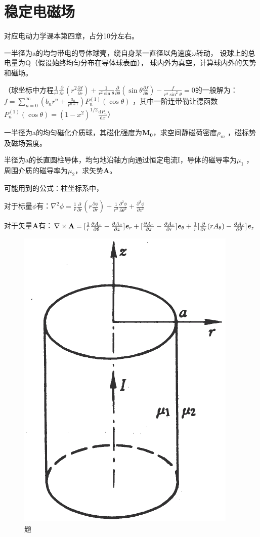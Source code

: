 \section{稳定电磁场}
对应电动力学课本第四章，占分10分左右。

\begin{question}
一半径为a的均匀带电的导体球壳，绕自身某一直径以角速度$\omega$转动，
设球上的总电量为Q（假设始终均匀分布在导体球表面），
球内外为真空，计算球内外的矢势和磁场。

\noindent（球坐标中方程$\frac{1}{r^2}\frac{\partial }{\partial r}(r^2\frac{\partial f}{\partial r})+\frac{1}{r^2 \sin\theta}\frac{\partial }{\partial \theta}(\sin\theta\frac{\partial f}{\partial \theta})-\frac{f}{r^2\sin^2\theta}=0$的一般解为：$f=\sum_{n=0}^{\infty }(b_nr^n+\frac{a_n}{r^{n+1}})P_n^{(1)}(\cos\theta)$
 ，其中一阶连带勒让德函数$P_n^{(1)}(\cos\theta)=(1-x^2)^{1/2}\frac{\mathrm{d}P_n }{\mathrm{d} x}$）
 \end{question}
 
\begin{question}
一半径为a的均匀磁化介质球，其磁化强度为$\mathbf{M_0}$，求空间静磁荷密度$\rho_m$ ，磁标势及磁场强度。
\end{question}

\begin{question}
半径为a的长直圆柱导体，均匀地沿轴方向通过恒定电流I，导体的磁导率为$\mu_1$ ，周围介质的磁导率为$\mu_2$，求矢势$\mathbf{A}$。

\noindent 可能用到的公式：柱坐标系中，

\noindent 对于标量$\phi$有：$\nabla^2\phi=\frac{1}{r}\frac{\partial }{\partial r}(r\frac{\partial \phi}{\partial r})+\frac{1}{r^2 }\frac{\partial^2 \phi}{\partial \theta^2}+\frac{\partial^2\phi}{\partial z^2}$ 

\noindent 对于矢量$\mathbf{A}$有：$\nabla \times \mathbf{A}=[\frac{1}{r}\frac{\partial A_z}{\partial \theta}-\frac{\partial A_\theta}{\partial z}]\textbf{\textit{e}}_r+[\frac{\partial A_r}{\partial z}-\frac{\partial A_z}{\partial r}]\textbf{\textit{e}}_\theta+\frac{1}{r}[\frac{\partial}{\partial r}(rA_\theta)-\frac{\partial A_r}{\partial \theta}]\textbf{\textit{e}}_z$
\begin{figure}[ht]
	\centering
	\includegraphics[height=3 cm]{images/q3_1.png}
	\caption{题\thequestion}
\end{figure}
\end{question}

